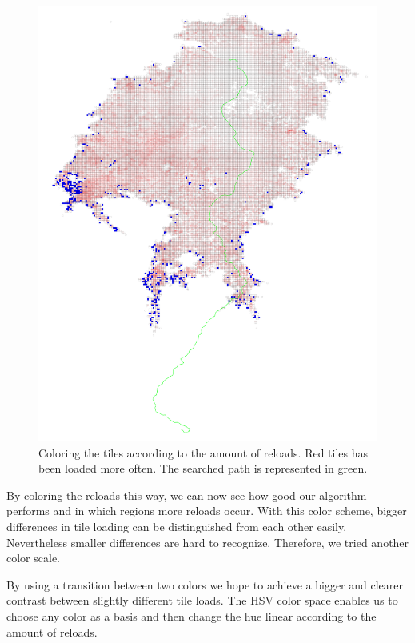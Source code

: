 \documentclass
[
    paper = a4,
    pagesize,
    12 pt,
    oneside,                       %
    open = right,
    DIV = calc,
    BCOR = 0 mm,                   %
    bibtotoc
]
{scrbook}
\begin{document}
\begin{figure}
    \includegraphics[width=\textwidth]{Images/vis-rgb-cache.png}
\caption[]{Coloring the tiles according to the amount of reloads. Red tiles has been loaded more often. The searched path is represented in green.}
\label{fig:reload_coloring_white}
\end{figure}

By coloring the reloads this way, we can now see how good our algorithm performs and in which regions more reloads occur.
With this color scheme, bigger differences in tile loading can be distinguished from each other easily.
Nevertheless smaller differences are hard to recognize.
Therefore, we tried another color scale.


By using a transition between two colors we hope to achieve a bigger and clearer contrast between slightly different tile loads.
The HSV color space enables us to choose any color as a basis and then change the hue linear according to the amount of reloads.
\end{document}
